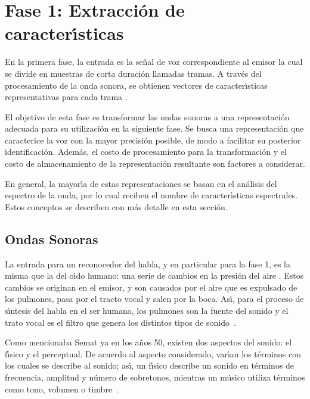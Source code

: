 \section{Fase 1: Extracci\'on de caracter{\'\i}sticas}
\label{sec:featureExtraction}

En la primera fase, la entrada es la se\~nal de voz correspondiente al emisor la cual se divide en muestras
de corta duraci\'on llamadas tramas. A trav\'es del procesamiento de la onda sonora, se obtienen vectores 
de caracter{\'\i}sticas representativas para cada trama \cite{Jurafsky}.

El objetivo de esta fase es transformar las ondas sonoras a una representaci\'on adecuada para su utilizaci\'on
en la siguiente fase. Se busca una representaci\'on que caracterice la voz con la mayor precisi\'on posible, de modo a
facilitar su posterior identificaci\'on. Adem\'as, el costo de procesamiento para la transformaci\'on y el costo
de almacenamiento de la representaci\'on resultante son factores a considerar.

En general, la mayor{\'\i}a de estas representaciones se basan en el an\'alisis del espectro
de la onda, por lo cual reciben el nombre de caracter{\'\i}sticas espectrales. 
Estos conceptos se describen con m\'as detalle en esta secci\'on.

\subsection{Ondas Sonoras}

La entrada para un reconocedor del habla, y en particular para la fase 1, es la misma que 
la del o{\'\i}do humano: una serie de cambios en la presi\'on del aire \cite{YoungUniversity2007}. 
Estos cambios se originan en el emisor, y son causados por el aire que es expulsado de los pulmones,
pasa por el tracto vocal y salen por la boca. As{\'\i}, para el 
proceso de s{\'\i}ntesis del habla en el ser humano, los pulmones son la fuente
del sonido y el trato vocal es el filtro que genera los distintos tipos de \mbox{sonido \cite{BradburyLineal2000}}.

Como mencionaba Semat ya en los a\~nos 50, existen dos aspectos del sonido: el f{\'\i}sico y el perceptual. De acuerdo al 
aspecto considerado, var{\'\i}an los t\'erminos con los cuales se describe al sonido; as{\'\i}, un f{\'\i}sico describe un 
sonido en t\'erminos de frecuencia, amplitud y n\'umero de sobretonos, mientras un m\'usico utiliza t\'erminos como tono, 
volumen o \mbox{timbre \cite{SematPhysics1958}}.

